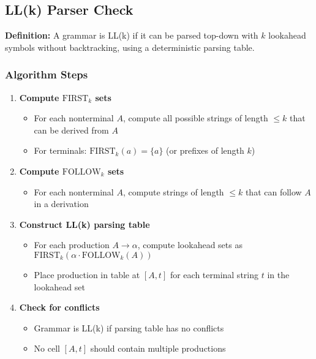 \subsection{LL(k) Parser Check}

\textbf{Definition:} A grammar is LL(k) if it can be parsed top-down with $k$ lookahead symbols without backtracking, using a deterministic parsing table.

\subsubsection{Algorithm Steps}

\begin{enumerate}
    \item \textbf{Compute $\text{FIRST}_k$ sets}
    \begin{itemize}
        \item For each nonterminal $A$, compute all possible strings of length $\leq k$ that can be derived from $A$
        \item For terminals: $\text{FIRST}_k(a) = \{a\}$ (or prefixes of length $k$)
    \end{itemize}

    \item \textbf{Compute $\text{FOLLOW}_k$ sets}
    \begin{itemize}
        \item For each nonterminal $A$, compute strings of length $\leq k$ that can follow $A$ in a derivation
    \end{itemize}

    \item \textbf{Construct LL(k) parsing table}
    \begin{itemize}
        \item For each production $A \to \alpha$, compute lookahead sets as $\text{FIRST}_k(\alpha \cdot \text{FOLLOW}_k(A))$
        \item Place production in table at $[A, t]$ for each terminal string $t$ in the lookahead set
    \end{itemize}

    \item \textbf{Check for conflicts}
    \begin{itemize}
        \item Grammar is LL(k) if parsing table has no conflicts
        \item No cell $[A, t]$ should contain multiple productions
    \end{itemize}

\end{enumerate}


